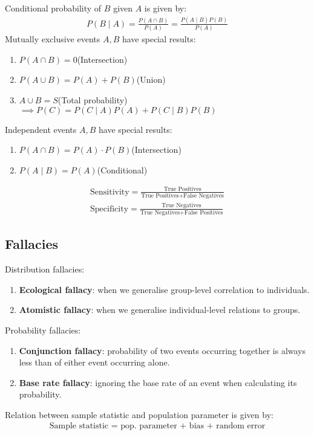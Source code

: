 \documentclass[12pt, a4paper]{article}
\begin{document}
\begin{multicols*}{3}
Conditional probability of $B$ given $A$ is given by:
\begin{align*}
  P(B\mid A) = \displaystyle\frac{P(A\cap B)}{P(A)} = \frac{P(A\mid B)P(B)}{P(A)}
\end{align*}
Mutually exclusive events $A,B$ have special results:
\begin{enumerate}[\roman*.]
  \item $P(A\cap B) = 0$\hfill(Intersection)
  \item $P(A\cup B) = P(A) + P(B)$\hfill(Union)
  \item $A \cup B = S$\hfill(Total probability)\\$\implies P(C) = P(C\mid A)P(A) + P(C\mid B)P(B)$
\end{enumerate}

Independent events $A,B$ have special results:
\begin{enumerate}[\roman*.]
  \item $P(A\cap B) = P(A)\cdot P(B)$\hfill(Intersection)
  \item $P(A\mid B) = P(A)$\hfill(Conditional)
\end{enumerate}
\begin{align*}
  \text{Sensitivity} = \frac{\text{True Positives}}{\text{True Positives} + \text{False Negatives}}\\
  \text{Specificity} = \frac{\text{True Negatives}}{\text{True Negatives} + \text{False Positives}}
\end{align*}

\subsection{Fallacies}
Distribution fallacies:
\begin{enumerate}[\roman*.]
  \item \textbf{Ecological fallacy}: when we generalise group-level correlation to individuals. 
  \item \textbf{Atomistic fallacy}: when we generalise individual-level relations to groups. 
\end{enumerate}

Probability fallacies:
\begin{enumerate}[\roman*.]
  \item \textbf{Conjunction fallacy}: probability of two events occurring together is always less than of either event occurring alone.
  \item \textbf{Base rate fallacy}: ignoring the base rate of an event when calculating its probability.
\end{enumerate}
\colbreak
Relation between sample statistic and population parameter is given by:
\begin{align*}
  \text{Sample statistic = pop. parameter + bias + random error}
\end{align*}


\end{multicols*}
\end{document}
